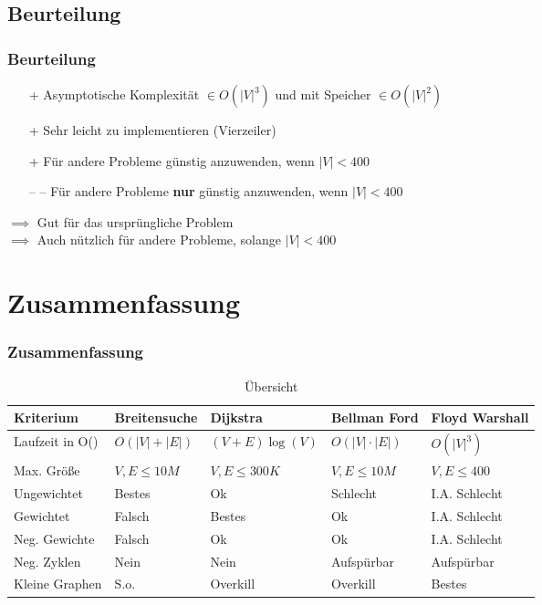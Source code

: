 
\subsection{Beurteilung} 

\begin{frame}
\frametitle{Beurteilung}
\begin{itemize}

\item[+] Asymptotische Komplexität $\in O(|V|^3)$  und mit Speicher $\in O(|V|^2)$
\item[+] Sehr leicht zu implementieren (Vierzeiler)
\item[+] Für andere Probleme günstig anzuwenden, wenn $|V|< 400$
\item[-- --] Für andere Probleme \textbf{nur} günstig anzuwenden, wenn $|V|< 400$
\end{itemize}

$\implies$ Gut für das ursprüngliche Problem\\
$\implies$ Auch nützlich für andere Probleme, solange $|V| < 400$
\end{frame}


\section{Zusammenfassung}

\begin{frame}
\frametitle{Zusammenfassung}
\footnotesize{\begin{table}
\begin{tabular}{l l l l l}
\toprule
\textbf{Kriterium} & \textbf{Breitensuche} & \textbf{Dijkstra} & \textbf{Bellman Ford} &\textbf{Floyd Warshall}\\
\midrule
Laufzeit in O() & $O(|V| + |E|)$ & $(V+E)\log(V)$ & $O(|V| \cdot |E|)$ & $O(|V|^3)$ \\
Max. Größe & $V,E \leq 10M$  & $V,E \leq 300K$ & $V,E \leq 10M$ & $V,E \leq 400$ \\
Ungewichtet & Bestes & Ok & Schlecht & I.A. Schlecht \\
Gewichtet & Falsch & Bestes & Ok & I.A. Schlecht \\
Neg. Gewichte & Falsch & Ok & Ok & I.A. Schlecht \\
Neg. Zyklen & Nein & Nein & Aufspürbar & Aufspürbar \\
Kleine Graphen & S.o. & Overkill & Overkill & Bestes \\
\bottomrule
\end{tabular}
\caption{Übersicht}
\end{table}}
\end{frame}

